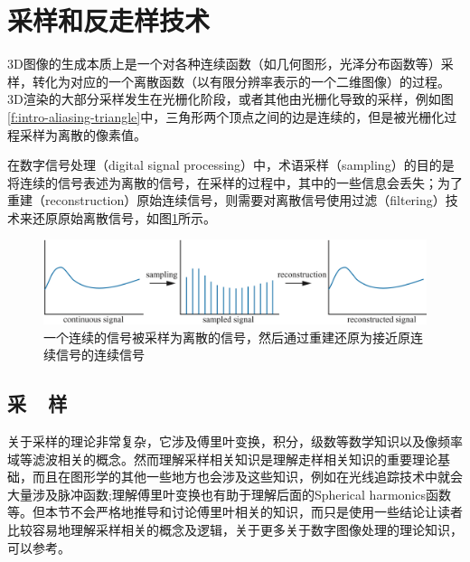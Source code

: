 \section{采样和反走样技术}\label{sec:intro-sampling}
3D图像的生成本质上是一个对各种连续函数（如几何图形，光泽分布函数等）采样，转化为对应的一个离散函数（以有限分辨率表示的一个二维图像）的过程。3D渲染的大部分采样发生在光栅化阶段，或者其他由光栅化导致的采样，例如图\ref{f:intro-aliasing-triangle}中，三角形两个顶点之间的边是连续的，但是被光栅化过程采样为离散的像素值。

在数字信号处理（digital signal processing）中，术语采样（sampling）的目的是将连续的信号表述为离散的信号，在采样的过程中，其中的一些信息会丢失；为了重建（reconstruction）原始连续信号，则需要对离散信号使用过滤（filtering）技术来还原原始离散信号，如图\ref{f:intro-signal-processing}所示。

\begin{figure}
\begin{fullwidth}
	\includegraphics[width=1.\thewidth]{figures/intro/signal-processing}
	\caption{一个连续的信号被采样为离散的信号，然后通过重建还原为接近原连续信号的连续信号}
\label{f:intro-signal-processing}
\end{fullwidth}
\end{figure}


\subsection{采~~样}\label{sec:intro-sampling}
关于采样的理论非常复杂，它涉及傅里叶变换，积分，级数等数学知识以及像频率域等滤波相关的概念。然而理解采样相关知识是理解走样相关知识的重要理论基础，而且在图形学的其他一些地方也会涉及这些知识，例如在光线追踪技术中就会大量涉及脉冲函数;理解傅里叶变换也有助于理解后面的Spherical harmonics函数等。但本节不会严格地推导和讨论傅里叶相关的知识，而只是使用一些结论让读者比较容易地理解采样相关的概念及逻辑，关于更多关于数字图像处理的理论知识，可以参考\cite{b:DigitalImageProcessing}。

